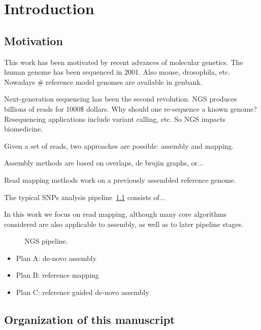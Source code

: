 \chapter{Introduction}


\section{Motivation}

This work has been motivated by recent advances of molecular genetics.
The human genome has been sequenced in 2001. Also mouse, drosophila, etc.
Nowadays \# reference model genomes are available in genbank.

Next-generation sequencing has been the second revolution.
NGS produces billions of reads for 1000\$ dollars.
Why should one re-sequence a known genome?
Resequencing applications include variant calling, etc.
So NGS impacts biomedicine.

Given a set of reads, two approaches are possible: assembly and mapping.

Assembly methods are based on overlaps, de brujin graphs, or...

Read mapping methods work on a previously assembled reference genome.

The typical SNPs analysis pipeline~\ref{fig:ngs-pipeline} consists of...

In this work we focus on read mapping, although many core algorithms considered are also applicable to assembly, as well as to later pipeline stages.

\begin{figure}[h]
\caption{NGS pipeline.}
\label{fig:ngs-pipeline}
\end{figure}

\begin{itemize}
\item Plan A: de-novo assembly
\item Plan B: reference mapping
\item Plan C: reference guided de-novo assembly
\end{itemize}

\section{Organization of this manuscript}